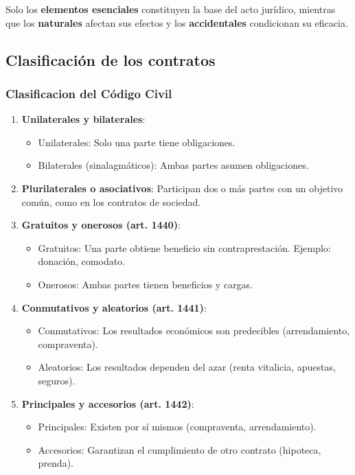 \documentclass{templateNote}
\begin{document}
Solo los \textbf{elementos esenciales} constituyen la base del acto jurídico, mientras que los \textbf{naturales} afectan sus efectos y los \textbf{accidentales} condicionan su eficacia.

\subsection{Clasificación de los contratos}
\subsubsection{Clasificacion del Código Civil}
\begin{enumerate}
    \item \textbf{Unilaterales y bilaterales}:
    \begin{itemize}
        \item Unilaterales: Solo una parte tiene obligaciones.
        \item Bilaterales (sinalagmáticos): Ambas partes asumen obligaciones.
    \end{itemize}
    \item \textbf{Plurilaterales o asociativos}: Participan dos o más partes con un objetivo común, como en los contratos de sociedad.
    \item \textbf{Gratuitos y onerosos (art. 1440)}:
    \begin{itemize}
        \item Gratuitos: Una parte obtiene beneficio sin contraprestación. Ejemplo: donación, comodato.
        \item Onerosos: Ambas partes tienen beneficios y cargas.
    \end{itemize}
    \item \textbf{Conmutativos y aleatorios (art. 1441)}:
    \begin{itemize}
        \item Conmutativos: Los resultados económicos son predecibles (arrendamiento, compraventa).
        \item Aleatorios: Los resultados dependen del azar (renta vitalicia, apuestas, seguros).
    \end{itemize}
    \item \textbf{Principales y accesorios (art. 1442)}:
    \begin{itemize}
        \item Principales: Existen por sí mismos (compraventa, arrendamiento).
        \item Accesorios: Garantizan el cumplimiento de otro contrato (hipoteca, prenda).

\end{itemize}
\end{enumerate}
\end{document}
